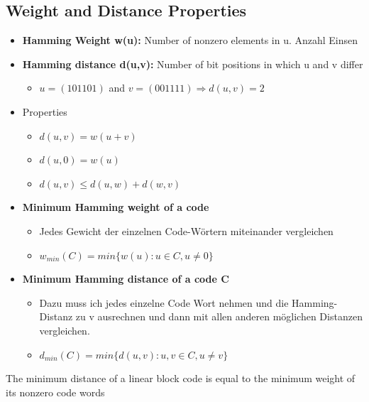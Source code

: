 \hypertarget{weight-and-distance-properties}{%
\subsection{Weight and Distance
Properties}\label{weight-and-distance-properties}}

\begin{itemize}
\tightlist
\item
  \textbf{Hamming Weight w(u):} Number of nonzero elements in u. Anzahl
  Einsen
\item
  \textbf{Hamming distance d(u,v):} Number of bit positions in which u
  and v differ

  \begin{itemize}
  \tightlist
  \item
    $u = (1 0 1 1 0 1)$ and $v = (0 0 1 1 1 1) \Rightarrow d(u,v) = 2$
  \end{itemize}
\item
  Properties

  \begin{itemize}
  \tightlist
  \item
    $d(u,v) = w(u + v)$
  \item
    $d(u,0) = w(u)$
  \item
    $d(u,v) \leq d(u,w) + d(w,v)$
  \end{itemize}
\item
  \textbf{Minimum Hamming weight of a code}

  \begin{itemize}
  \tightlist
  \item
    Jedes Gewicht der einzelnen Code-Wörtern miteinander vergleichen
  \item
    $w_{min}(C) = min \{w(u): u \in C, u \neq 0\}$
  \end{itemize}
\item
  \textbf{Minimum Hamming distance of a code C}

  \begin{itemize}
  \tightlist
  \item
    Dazu muss ich jedes einzelne Code Wort nehmen und die
    Hamming-Distanz zu v ausrechnen und dann mit allen anderen möglichen
    Distanzen vergleichen.
  \item
    $d_{min}(C) = min \{d(u,v): u,v \in C, u \neq v\}$
  \end{itemize}
\end{itemize}

\begin{tcolorbox}[colback=red!5!white,colframe=red!75!black]
The minimum distance of a linear block code is equal to the minimum weight of its nonzero code words
\end{tcolorbox}

